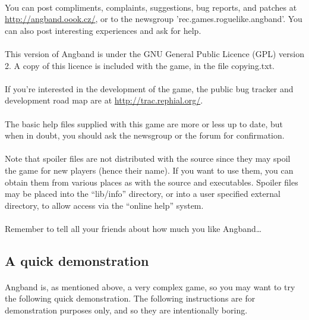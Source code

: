 \paragraph{}You can post compliments, complaints, suggestions, bug reports, and
patches at \url{http://angband.oook.cz/}, or to the newsgroup
'rec.games.roguelike.angband'. You can also post interesting experiences
and ask for help.

\paragraph{}This version of Angband is under the GNU General Public Licence (GPL)
version 2. A copy of this licence is included with the game, in the file
copying.txt.

\paragraph{}If you're interested in the development of the game, the public bug
tracker and development road map are at \url{http://trac.rephial.org/}.

\paragraph{}The basic help files supplied with this game are more or less up to
date, but when in doubt, you should ask the newsgroup or the forum for
confirmation.

\paragraph{}Note that spoiler files are not distributed with the source since they
may spoil the game for new players (hence their name). If you want to
use them, you can obtain them from various places as with the source and
executables. Spoiler files may be placed into the ``lib/info'' directory,
or into a user specified external directory, to allow access via the
``online help'' system.

\paragraph{}Remember to tell all your friends about how much you like
Angband\ldots

\subsection{A quick demonstration}
\paragraph{}Angband is, as mentioned above, a very complex game, so you
may want to try the following quick demonstration. The following
instructions are for demonstration purposes only, and so they are
intentionally boring.

